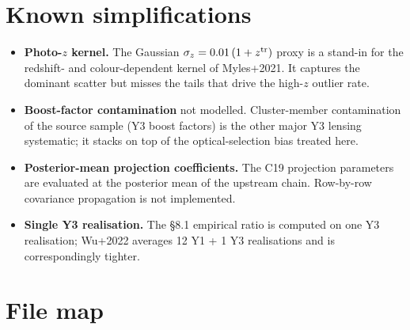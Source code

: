 \documentclass[a4paper, 11pt]{article}
\newcommand{\ztr}{z^{\rm tr}}
\begin{document}
\section{Known simplifications}
\label{sec:future}

\begin{itemize}
  \setlength\itemsep{2pt}
  \item \textbf{Photo-$z$ kernel.} The Gaussian
    $\sigma_z = 0.01\,(1+\ztr)$ proxy is a stand-in for the
    redshift- and colour-dependent kernel of Myles+2021. It captures
    the dominant scatter but misses the tails that drive the
    high-$z$ outlier rate.
  \item \textbf{Boost-factor contamination} not modelled. Cluster-member
    contamination of the source sample (Y3 boost factors) is the other
    major Y3 lensing systematic; it stacks on top of the
    optical-selection bias treated here.
  \item \textbf{Posterior-mean projection coefficients.} The C19
    projection parameters are evaluated at the posterior mean of the
    upstream chain. Row-by-row covariance propagation is not
    implemented.
  \item \textbf{Single Y3 realisation.} The §8.1 empirical ratio is
    computed on one Y3 realisation; Wu+2022 averages 12 Y1 + 1 Y3
    realisations and is correspondingly tighter.
\end{itemize}

\section{File map}
\label{sec:files}
\end{document}
